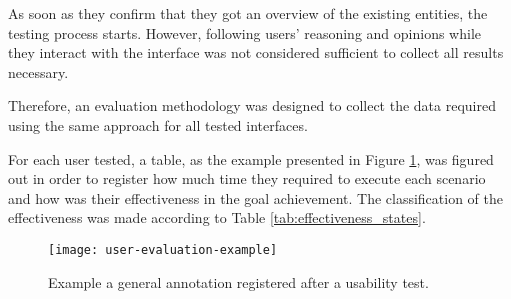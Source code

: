 As soon as they confirm that they got an overview of the existing entities, the testing process starts. However, following users' reasoning and opinions while they interact with the interface was not considered sufficient to collect all results necessary.

Therefore, an evaluation methodology was designed to collect the data required using the same approach for all tested interfaces.

For each user tested, a table, as the example presented in Figure \ref{fig:userEvaluationExample}, was figured out in order to register how much time they required to execute each scenario and how was their effectiveness in the goal achievement. The classification of the effectiveness was made according to Table \ref{tab:effectiveness_states}.

\begin{figure}[htbp]
	\centering
	\texttt{[image: user-evaluation-example]}
	\caption{Example a general annotation registered after a usability test.}
	\label{fig:userEvaluationExample}
\end{figure}

